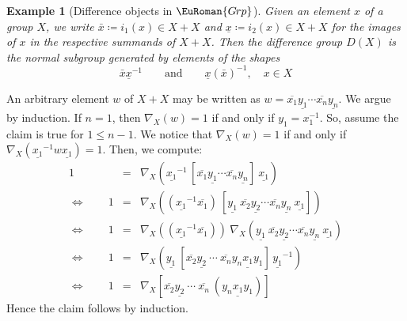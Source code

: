 \documentclass [12pt,oneside]{book}%
\makeatletter
\theoremstyle{captionstyle}  %
\newtheorem{example}[theorem]{Example}
\renewenvironment{proof}[1][\proofname]{\vspace{-2ex}\par       %
	\pushQED{\qed}%
	\normalfont \topsep6\p@\@plus6\p@\relax
	\trivlist
	\item[\hskip\labelsep
	            \color{proofcaption}\bfseries                %
	            #1\@addpunct{\quad}]\ignorespaces
}{%
	\popQED\endtrivlist\@endpefalse
}
\newcommand{\DefEq}{\coloneq} 		%
\newcommand{\InclsnOf}[1]{\textit{i}_{#1}}		%
\newcommand{\FoldOn}[1]{\nabla_{#1}}				%
\newcommand{\Grps}{\EuRoman{G{\kern -.15ex}rp}}				%
\makeatother
\begin{document}
\begin{example}[Difference objects in $\Grps$]
    Given an element $x$ of a group $X$, we write $\bar{x}\DefEq \InclsnOf{1}(x) \in X+X$ and $\underline{x}\DefEq \InclsnOf{2}(x)\in X+X$ for the images of $x$ in the respective summands of $X+X$. Then the difference group $D(X)$ is the normal subgroup generated by elements of the shapes
    \begin{equation*}
        \bar{x}\underline{x}^{-1}  \qquad \text{and}\qquad \underline{x}(\bar{x})^{-1},\quad x\in X
    \end{equation*}
\end{example}
\begin{proof}
    An arbitrary element $w$ of $X+X$ may be written as $w=\overline{x_1}\underline{y_1}\cdots \overline{x_n}\underline{y_n}$. We argue by induction. If $n=1$, then $\FoldOn{X}(w)=1$ if and only if  $y_{1}=x_{1}^{-1}$. So, assume the claim is true for $1\leq n-1$. We notice that $\FoldOn{X}(w)=1$ if and only if $\FoldOn{X}\left( \underline{x_{1}}^{-1} w \underline{x_{1}}\right) = 1$. Then, we compute:
    \begin{equation*}
        \begin{array}{rcl}
            1                      & = & \FoldOn{X} \left( \underline{x_{1}}^{-1}\, \left[ \overline{x_1}\underline{y_1}\cdots  \overline{x_n}\underline{y_n}\right] \ \underline{x_{1}}\right)                                                          \\
            \Leftrightarrow\qquad1 & = & \FoldOn{X}\left( (\underline{x_{1}}^{-1}\overline{x_{1}})\ \left[  \underline{y_{1}}\ \overline{x_{2}} \underline{y_{2}}\cdots \overline{x_{n}}\underline{y_{n}}\ \underline{x_{1}} \right] \right)             \\
            \Leftrightarrow\qquad1 & = & \FoldOn{X}\left( (\underline{x_{1}}^{-1}\overline{x_{1}}) \right) \ \FoldOn{X}\left( \underline{y_{1}}\ \overline{x_{2}} \underline{y_{2}}\cdots \overline{x_{n}}\underline{y_{n}}\ \underline{x_{1}}   \right) \\
            \Leftrightarrow\qquad1 & = & \FoldOn{X}\left( \underline{y_{1}}\ \left[ \overline{x_{2}}\underline{y_{2}}\ \cdots\ \overline{x_{n}} \underline{y_{n}x_{1}y_{1}}\right]\, \underline{y_{1}}^{-1}\right)                                       \\
            \Leftrightarrow\qquad1 & = & \FoldOn{X}\left[ \overline{x_{2}}\underline{y_{2}}\ \cdots\ \overline{x_{n}} \ \left( \underline{y_{n}x_{1}y_{1}}\right) \right]
        \end{array}
    \end{equation*}
    Hence the claim follows by induction.
\end{proof}
\end{document}
